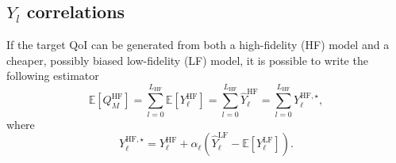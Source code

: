 \subsection{$Y_l$ correlations} \label{uq:sampling:mlmf:Ycorr}

If the target QoI can be generated from both a high-fidelity (HF) model 
and a cheaper, possibly biased low-fidelity (LF) model, it is possible 
to write the following estimator
\begin{equation}\label{EQ: MLMF estimator}
 \mathbb{E}\left[Q_M^{\mathrm{HF}}\right] = \sum_{l=0}^{L_{\mathrm{HF}}} \mathbb{E}\left[Y^{\mathrm{HF}}_{\ell}\right] 
                                          = \sum_{l=0}^{L_{\mathrm{HF}}} \hat{Y}^{\mathrm{HF}}_{\ell} = \sum_{l=0}^{L_{\mathrm{HF}}} Y^{{\mathrm{HF}},\star}_{\ell},
\end{equation}
where
\begin{equation}
 Y^{{\mathrm{HF}},\star}_{\ell} = Y^{\mathrm{HF}}_{\ell} + \alpha_\ell \left( \hat{Y}^{\mathrm{LF}}_{\ell} - \mathbb{E}\left[{Y^{\mathrm{LF}}_{\ell}}\right] \right).
\end{equation}

